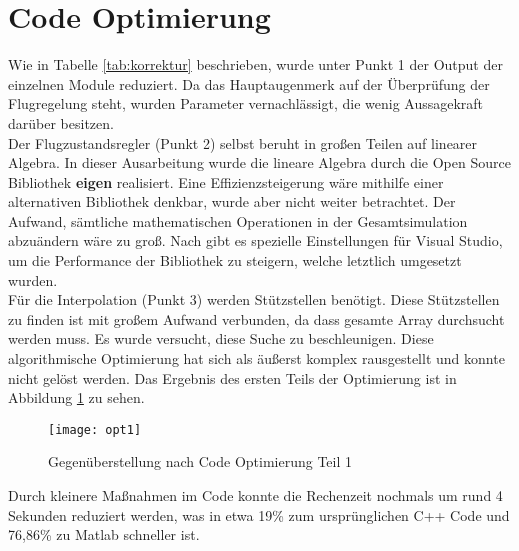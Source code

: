 \section{Code Optimierung}
Wie in Tabelle \ref{tab:korrektur} beschrieben, wurde unter Punkt 1 der Output der einzelnen Module reduziert. Da das Hauptaugenmerk auf der Überprüfung der Flugregelung steht, wurden Parameter vernachlässigt, die wenig Aussagekraft darüber besitzen.\\ Der Flugzustandsregler (Punkt 2) selbst beruht in großen Teilen auf linearer Algebra. In dieser Ausarbeitung wurde die lineare Algebra durch die Open Source Bibliothek \textbf{eigen} realisiert. Eine Effizienzsteigerung wäre mithilfe einer alternativen Bibliothek denkbar, wurde aber nicht weiter betrachtet. Der Aufwand, sämtliche mathematischen Operationen in der Gesamtsimulation abzuändern wäre zu groß. Nach \cite{TuxFamily.2018} gibt es spezielle Einstellungen für Visual Studio, um die Performance der Bibliothek zu steigern, welche letztlich umgesetzt wurden. \\  Für die Interpolation (Punkt 3) werden Stützstellen benötigt. Diese Stützstellen zu finden ist mit großem Aufwand verbunden, da dass gesamte Array durchsucht werden muss. Es wurde versucht, diese Suche zu beschleunigen. Diese algorithmische Optimierung hat sich als äußerst komplex rausgestellt und konnte nicht gelöst werden. Das Ergebnis des ersten Teils der Optimierung ist in Abbildung \ref{fig:opt1} zu sehen.\newpage
\begin{figure}[h]
	\centering
	\texttt{[image: opt1]}
	\caption{Gegenüberstellung nach Code Optimierung Teil 1}
	\label{fig:opt1}
\end{figure}\noindent
Durch kleinere Maßnahmen im Code konnte die Rechenzeit nochmals um rund 4 Sekunden reduziert werden, was in etwa 19\% zum ursprünglichen C++ Code und 76,86\% zu Matlab schneller ist.
